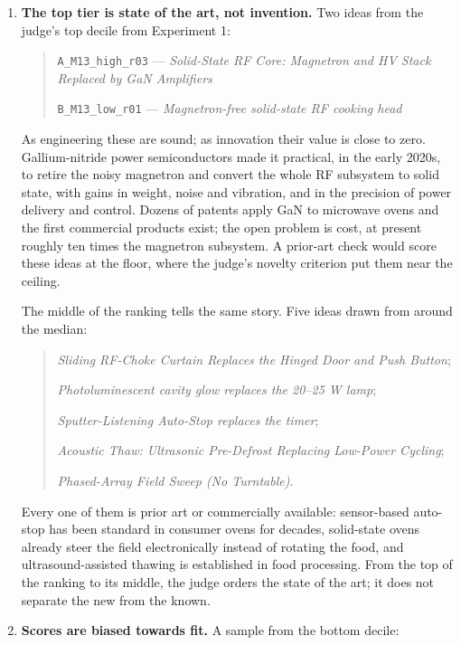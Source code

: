 \begin{enumerate}
\def\labelenumi{\arabic{enumi}.}
\item
  \textbf{The top tier is state of the art, not invention.} Two ideas from the judge's top decile from Experiment 1:

  \begin{quote}
  \texttt{A\_M13\_high\_r03} --- \emph{Solid-State RF Core: Magnetron and HV Stack Replaced by GaN Amplifiers}
  
  \texttt{B\_M13\_low\_r01} --- \emph{Magnetron-free solid-state RF cooking head}
  \end{quote}

  As engineering these are sound; as innovation their value is close to zero. Gallium-nitride power semiconductors made it practical, in the early 2020s, to retire the noisy magnetron and convert the whole RF subsystem to solid state, with gains in weight, noise and vibration, and in the precision of power delivery and control. Dozens of patents apply GaN to microwave ovens and the first commercial products exist; the open problem is cost, at present roughly ten times the magnetron subsystem. A prior-art check would score these ideas at the floor, where the judge's novelty criterion put them near the ceiling.

  The middle of the ranking tells the same story. Five ideas drawn from around the median: 
  
\begin{quote}

\emph{Sliding RF-Choke Curtain Replaces the Hinged Door and Push Button}; 

\emph{Photoluminescent cavity glow replaces the 20--25 W lamp}; 

\emph{Sputter-Listening Auto-Stop replaces the timer}; 

\emph{Acoustic Thaw: Ultrasonic Pre-Defrost Replacing Low-Power Cycling}; 

\emph{Phased-Array Field Sweep (No Turntable)}. 
  
\end{quote}
  
  Every one of them is prior art or commercially available: sensor-based auto-stop has been standard in consumer ovens for decades, solid-state ovens already steer the field electronically instead of rotating the food, and ultrasound-assisted thawing is established in food processing. From the top of the ranking to its middle, the judge orders the state of the art; it does not separate the new from the known.
\item
  \textbf{Scores are biased towards fit.} A sample from the bottom decile: 


\end{enumerate}
